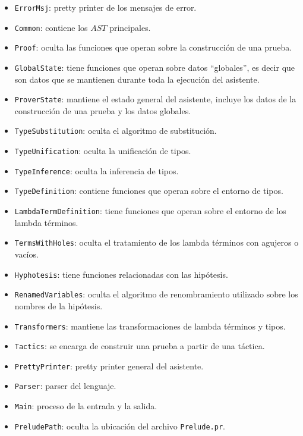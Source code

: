 \documentclass[a4paper,11pt]{article}
\theoremstyle{definition}
\theoremstyle{remark}
\begin{document}
\begin{itemize}

\item \texttt{ErrorMsj}: pretty printer de los mensajes de error.
\item \texttt{Common}: contiene los $AST$ principales.
\item \texttt{Proof}: oculta las funciones que operan sobre la construcción de una prueba.
\item \texttt{GlobalState}: tiene funciones que operan sobre datos ``globales'', es decir que son
datos que se mantienen durante toda la ejecución del asistente.
\item \texttt{ProverState}: mantiene el estado general del asistente, incluye los datos de la
construcción de una prueba y los datos globales.
\item \texttt{TypeSubstitution}: oculta el algoritmo de substitución.
\item \texttt{TypeUnification}: oculta la unificación de tipos.
\item \texttt{TypeInference}: oculta la inferencia de tipos.
\item \texttt{TypeDefinition}: contiene funciones que operan sobre el entorno de tipos.
\item \texttt{LambdaTermDefinition}: tiene funciones que operan sobre el entorno de los lambda términos.
\item \texttt{TermsWithHoles}: oculta el tratamiento de los lambda términos con agujeros o vacíos.
\item \texttt{Hyphotesis}: tiene funciones relacionadas con las hipótesis.
\item \texttt{RenamedVariables}: oculta el algoritmo de renombramiento utilizado sobre los nombres de la hipótesis.
\item \texttt{Transformers}: mantiene las transformaciones de lambda términos y tipos.
\item \texttt{Tactics}: se encarga de construir una prueba a partir de una táctica.
\item \texttt{PrettyPrinter}: pretty printer general del asistente.
\item \texttt{Parser}: parser del lenguaje.
\item \texttt{Main}: proceso de la entrada y la salida. 
\item \texttt{PreludePath}: oculta la ubicación del archivo \texttt{Prelude.pr}.

\end{itemize}
\end{document}
